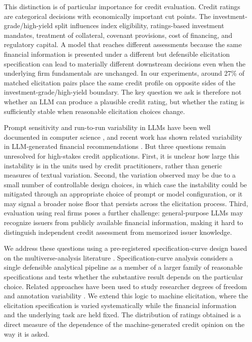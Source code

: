 \documentclass[pdflatex,sn-nature,lineno]{sn-jnl}
\theoremstyle{thmstyleone}
\begin{document}
This distinction is of particular importance for credit evaluation. Credit ratings are categorical
decisions with economically important cut points. The investment-grade/high-yield split influences index
eligibility, ratings-based investment mandates, treatment of collateral, covenant provisions, cost of
financing, and regulatory capital. A model that reaches different assessments because the same financial
information is presented under a different but defensible elicitation specification can lead to materially
different downstream decisions even when the underlying firm fundamentals are unchanged. In our
experiments, around 27\% of matched elicitation pairs place the same credit profile on opposite sides of
the investment-grade/high-yield boundary. The key question we ask is therefore not whether an LLM can
produce a plausible credit rating, but whether the rating is sufficiently stable when reasonable
elicitation choices change.

Prompt sensitivity and run-to-run variability in LLMs have been well documented in computer science
\cite{atil2024nondeterminism,kaplan2020scaling}, and recent work has shown related variability in
LLM-generated financial recommendations \cite{chon2025variability}. But three questions remain
unresolved for high-stakes credit applications. First, it is unclear how large this
instability is in the units used by credit practitioners, rather than generic measures of textual
variation. Second, the variation observed may be due to a small number of controllable design choices,
in which case the instability could be mitigated through an appropriate choice of prompt or model
configuration, or it may signal a broader noise floor that persists across the elicitation process. Third,
evaluation using real firms poses a further challenge: general-purpose LLMs may recognize issuers from
publicly available financial information, making it hard to distinguish independent credit assessment
from memorized issuer knowledge.

We address these questions using a pre-registered specification-curve design based on the
multiverse-analysis literature \cite{simonsohn2020specification,steegen2016multiverse}.
Specification-curve analysis considers a single defensible analytical pipeline as a member of a larger
family of reasonable specifications and tests whether the substantive result depends on the particular
choice. Related approaches have been used to study researcher degrees of freedom and annotation
variability \cite{camuffo2026variance}. We extend this logic to machine elicitation, where the
elicitation specification is varied systematically while the financial information and the underlying
task are held fixed. The distribution of ratings obtained is a direct measure of the dependence of the
machine-generated credit opinion on the way it is asked.
\end{document}

